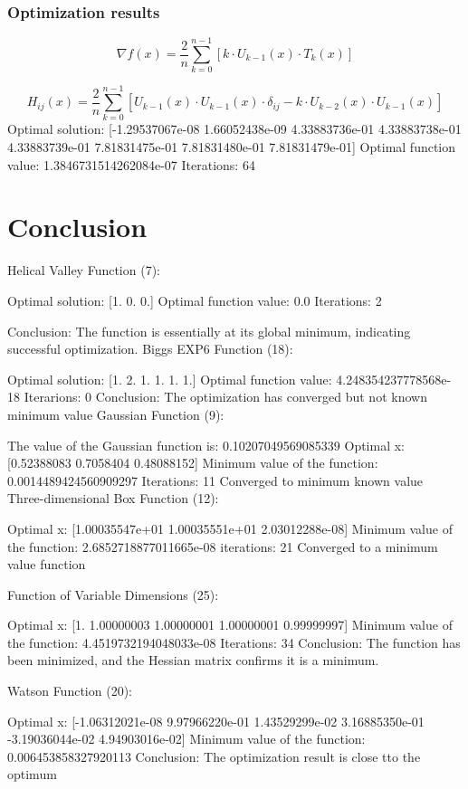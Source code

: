 \documentclass{article}
\begin{document}
 \subsubsection{Optimization results}
$$ \nabla f(x) = \frac{2}{n} \sum_{k=0}^{n-1} \left[ k \cdot U_{k-1}(x) \cdot T_k(x) \right]$$

$$H_{ij}(x) = \frac{2}{n} \sum_{k=0}^{n-1} \left[ U_{k-1}(x) \cdot U_{k-1}(x) \cdot \delta_{ij} - k \cdot U_{k-2}(x) \cdot U_{k-1}(x) \right]$$
Optimal solution: [-1.29537067e-08  1.66052438e-09  4.33883736e-01  4.33883738e-01
  4.33883739e-01  7.81831475e-01  7.81831480e-01  7.81831479e-01]
Optimal function value: 1.3846731514262084e-07
Iterations: 64

\section*{Conclusion}

Helical Valley Function (7):

Optimal solution: [1. 0. 0.]
Optimal function value: 0.0
Iterations: 2


Conclusion: The function is essentially at its global minimum, indicating successful optimization.
Biggs EXP6 Function (18):

Optimal solution: [1. 2. 1. 1. 1. 1.]
Optimal function value: 4.248354237778568e-18
Iterarions: 0
Conclusion: The optimization has converged but not known minimum value
Gaussian Function (9):

The value of the Gaussian function is: 0.10207049569085339
Optimal x: [0.52388083 0.7058404  0.48088152]
Minimum value of the function: 0.0014489424560909297
Iterations: 11
Converged to minimum known value
Three-dimensional Box Function (12):

Optimal x: [1.00035547e+01 1.00035551e+01 2.03012288e-08]
Minimum value of the function: 2.6852718877011665e-08
iterations: 21
Converged to a minimum value function

Function of Variable Dimensions (25):

Optimal x: [1.         1.00000003 1.00000001 1.00000001 0.99999997]
Minimum value of the function: 4.4519732194048033e-08
Iterations: 34
Conclusion: The function has been minimized, and the Hessian matrix confirms it is a minimum.


Watson Function (20):

Optimal x: [-1.06312021e-08  9.97966220e-01  1.43529299e-02  3.16885350e-01
 -3.19036044e-02  4.94903016e-02]
Minimum value of the function: 0.006453858327920113
Conclusion: The optimization result is close tto the optimum 
\end{document}
